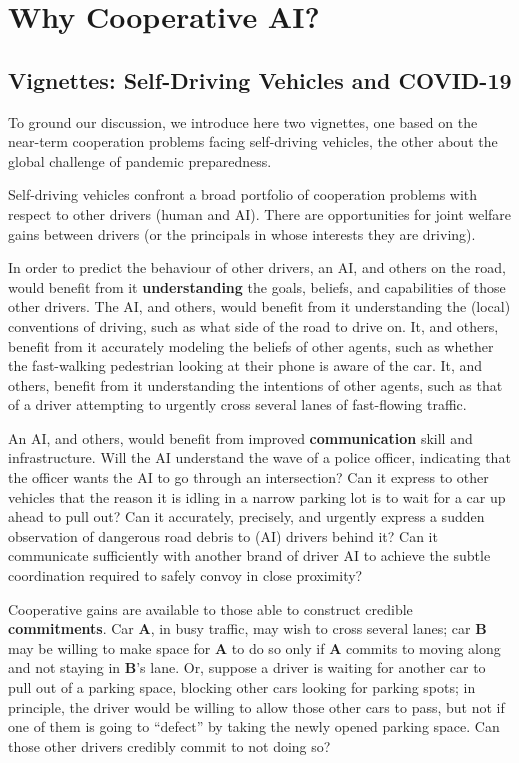 \documentclass[11pt, a4paper, logo, onecolumn, nonumbering]{deepmind}
\begin{document}
\section{Why Cooperative AI?}
\label{section:why}

\subsection{Vignettes: Self-Driving Vehicles and COVID-19}

To ground our discussion, we introduce here two vignettes, one based on the near-term cooperation problems facing self-driving vehicles, the other about the global challenge of pandemic preparedness. 

Self-driving vehicles confront a broad portfolio of cooperation problems with respect to other drivers (human and AI). There are opportunities for joint welfare gains between drivers (or the principals in whose interests they are driving).

In order to predict the behaviour of other drivers, an AI, and others on the road, would benefit from it \textbf{understanding} the goals, beliefs, and capabilities of those other drivers. The AI, and others, would benefit from it understanding the (local) conventions of driving, such as what side of the road to drive on. It, and others, benefit from it accurately modeling the beliefs of other agents, such as whether the fast-walking pedestrian looking at their phone is aware of the car. It, and others, benefit from it understanding the intentions of other agents, such as that of a driver attempting to urgently cross several lanes of fast-flowing traffic.

An AI, and others, would benefit from improved \textbf{communication} skill and infrastructure. Will the AI understand the wave of a police officer, indicating that the officer wants the AI to go through an intersection? Can it express to other vehicles that the reason it is idling in a narrow parking lot is to wait for a car up ahead to pull out? Can it accurately, precisely, and urgently express a sudden observation of dangerous road debris to (AI) drivers behind it? Can it communicate sufficiently with another brand of driver AI to achieve the subtle coordination required to safely convoy in close proximity?

Cooperative gains are available to those able to construct credible \textbf{commitments}.
Car \textbf{A}, in busy traffic, may wish to cross several lanes; car \textbf{B} may be willing to make space for \textbf{A} to do so only if \textbf{A} commits to moving along and not staying in \textbf{B}'s lane. Or, suppose a driver is waiting for another car to pull out of a parking space, blocking other cars looking for parking spots; in principle, the driver would be willing to allow those other cars to pass, but not if one of them is going to ``defect'' by taking the newly opened parking space. Can those other drivers credibly commit to not doing so? 
\end{document}
